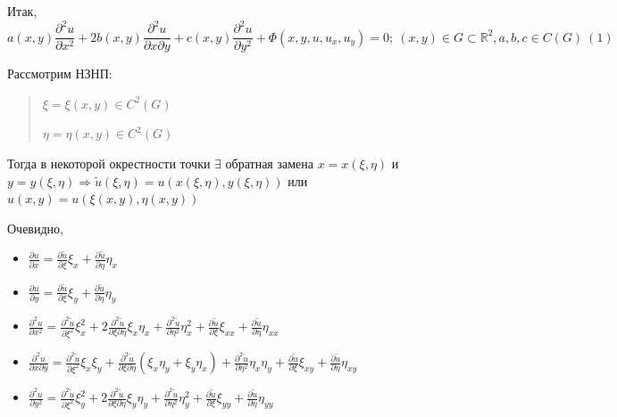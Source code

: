 Итак, \[a(x, y)\frac{\partial^2u}{\partial x^2} + 2b(x, y)\frac{\partial^2u}{\partial x \partial y} + c(x, y)\frac{\partial^2u}{\partial y^2} + \Phi(x, y, u, u_x, u_y)=0;\ (x, y) \in G \subset \mathbb{R}^2, a, b, c \in C(G)\ (1)\]

Рассмотрим НЗНП:
\begin{quote}
	$\xi = \xi(x, y) \in C^2(G)$

	$\eta = \eta(x, y) \in C^2(G)$
\end{quote}

Тогда в некоторой окрестности точки $\exists$ обратная замена $x=x(\xi, \eta)$ и $y=y(\xi, \eta) \Rightarrow \tilde u(\xi, \eta)=u(x(\xi, \eta), y(\xi, \eta))$ или $u(x, y)=u(\xi(x, y), \eta(x, y))$

\noindent
Очевидно,
\begin{itemize}
	\item $\displaystyle
		      \frac{\partial u}{\partial x}
		      = \frac{\partial \tilde u}{\partial \xi}\xi_x
		      + \frac{\partial \tilde u}{\partial \eta}\eta_x
	      $
	\item $\displaystyle
		      \frac{\partial u}{\partial y}
		      = \frac{\partial \tilde u}{\partial \xi}\xi_y
		      + \frac{\partial \tilde u}{\partial \eta}\eta_y
	      $
	\item $\displaystyle
		      \frac{\partial^2 u}{\partial x^2}
		      = \frac{\partial^2 \tilde u}{\partial \xi^2}\xi_x^2
		      + 2\frac{\partial^2 \tilde u}{\partial \xi \partial \eta}\xi_x\eta_x
		      + \frac{\partial^2 \tilde u}{\partial \eta^2}\eta_x^2
		      + \frac{\partial \tilde u}{\partial \xi}\xi_{xx}
		      + \frac{\partial \tilde u}{\partial \eta}\eta_{xx}
	      $
	\item $\displaystyle
		      \frac{\partial^2 u}{\partial x \partial y}
		      = \frac{\partial^2 \tilde u}{\partial \xi^2}\xi_x\xi_y
		      + \frac{\partial^2 \tilde u}{\partial \xi \partial \eta}(\xi_x\eta_y + \xi_y\eta_x)
		      + \frac{\partial^2 \tilde u}{\partial \eta^2}\eta_x\eta_y
		      + \frac{\partial \tilde u}{\partial \xi}\xi_{xy}
		      + \frac{\partial \tilde u}{\partial \eta}\eta_{xy}
	      $
	\item $\displaystyle
		      \frac{\partial^2 u}{\partial y^2}
		      = \frac{\partial^2 \tilde u}{\partial \xi^2}\xi_y^2
		      + 2\frac{\partial^2 \tilde u}{\partial \xi \partial \eta}\xi_y\eta_y
		      + \frac{\partial^2 \tilde u}{\partial \eta^2}\eta_y^2
		      + \frac{\partial \tilde u}{\partial \xi}\xi_{yy}
		      + \frac{\partial \tilde u}{\partial \eta}\eta_{yy}
	      $
\end{itemize}
